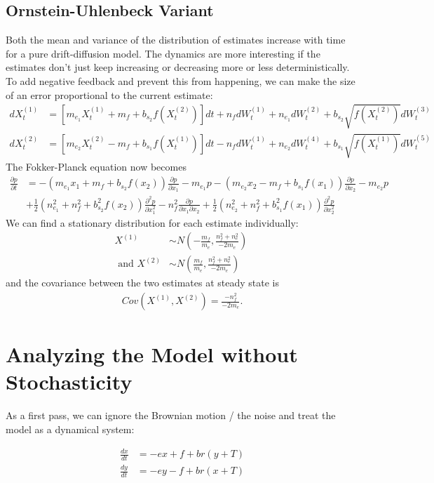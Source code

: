 \documentclass{article}
\begin{document}
\subsection{Ornstein-Uhlenbeck Variant }
Both the mean and variance of the distribution of estimates increase with time for a pure drift-diffusion model.  The dynamics are more interesting if the estimates don't just keep increasing or decreasing more or less deterministically.  To add negative feedback and prevent this from happening, we can make the size of an error proportional to the current estimate:
\begin{align*}
dX_t^{(1)}&=\left[m_{e_1}X_t^{(1)}+m_f+b_{s_2}f(X_t^{(2)})\right]dt+n_fdW_t^{(1)}+n_{e_1}dW_t^{(2)}+b_{s_2}\sqrt{f(X_t^{(2)})}dW_t^{(3)}
\\ dX_t^{(2)}&=\left[m_{e_2}X_t^{(2)}-m_f+b_{s_1}f(X_t^{(1)})\right]dt-n_fdW_t^{(1)}+n_{e_2}dW_t^{(4)}+b_{s_1}\sqrt{f(X_t^{(1)})}dW_t^{(5)}
\end{align*}
The Fokker-Planck equation now becomes
\begin{align*}
 \frac{\partial p}{\partial t}&=-(m_{e_1}x_1+m_f+b_{s_2}f(x_2))\frac{\partial p}{\partial x_1}-m_{e_1}p-(m_{e_2}x_2-m_f+b_{s_1}f(x_1))\frac{\partial p}{\partial x_2}-m_{e_2}p
\\&+\frac{1}{2}(n_{e_1}^2+n_f^2+b_{s_2}^2f(x_2))\frac{\partial^2 p}{\partial x_1^2}-n_f^2\frac{\partial p}{\partial x_1\partial x_2}+\frac{1}{2}(n_{e_2}^2+n_f^2+b_{s_1}^2f(x_1))\frac{\partial^2 p}{\partial x_2^2}
\end{align*}
We can find a stationary distribution for each estimate individually:
\begin{align}
X^{(1)}& \sim N\left(-\frac{m_f}{m_e},\frac{n_f^2+n_e^2}{-2m_e}\right)\ \label{ou_stat1}
\\ \text{ and } X^{(2)} &\sim N\left(\frac{m_f}{m_e},\frac{n_f^2+n_e^2}{-2m_e}\right) \label{ou_stat2}
\end{align}
and the covariance between the two estimates at steady state is
\begin{align*}
Cov(X^{(1)},X^{(2)})=\frac{-n_f^2}{-2m_e}.
\end{align*}

\section{Analyzing the Model without Stochasticity }
As a first pass, we can ignore the Brownian motion / the noise and treat the model as a dynamical system:

\begin{align*}
\frac{dx}{dt}&=-ex+f+br(y+T)
\\ \frac{dy}{dt}&=-ey-f+br(x+T)
\end{align*}
\end{document}
